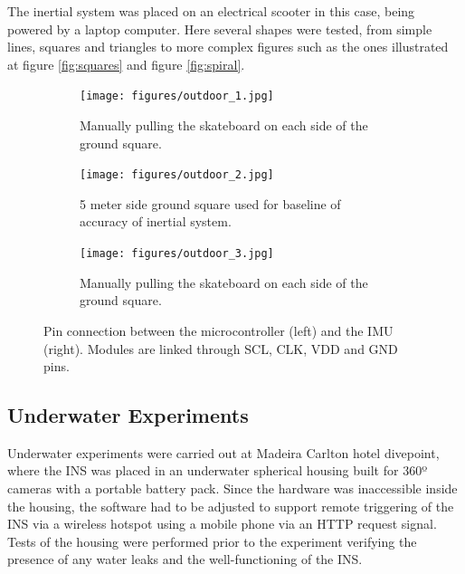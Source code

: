 

The inertial system was placed on an electrical scooter in this case, being powered by a laptop computer. Here several shapes were tested, from simple lines, squares and triangles to more complex figures such as the ones illustrated at figure \ref{fig:squares} and figure \ref{fig:spiral}.

\begin{figure}[!h]
    \centering
    \begin{subfigure}{0.7\textwidth}
        \centering
        \texttt{[image: figures/outdoor\_1.jpg]}
        \caption{ Manually pulling the skateboard on each side of the ground square. }
        \label{fig:outdoor_1}
    \end{subfigure}

    \begin{subfigure}{0.40\textwidth}
        \centering
        \texttt{[image: figures/outdoor\_2.jpg]}
        \caption{5 meter side ground square used for baseline of accuracy of inertial system.}
        \label{fig:outdoor_2}
    \end{subfigure}
    \begin{subfigure}{0.40\textwidth}
        \centering
        \texttt{[image: figures/outdoor\_3.jpg]}
        \caption{ Manually pulling the skateboard on each side of the ground square. }
        \label{fig:outdoor_3}
    \end{subfigure}
    \caption{Pin connection between the microcontroller (left) and the IMU (right). Modules are linked through SCL, CLK, VDD and GND pins.}
    \label{fig:hardware}
\end{figure}

\subsection{Underwater Experiments}

Underwater experiments were carried out at Madeira Carlton hotel divepoint, where the INS was placed in an underwater spherical housing built for 360º cameras with a portable battery pack. Since the hardware was inaccessible inside the housing, the software had to be adjusted to support remote triggering of the INS via a wireless hotspot using a mobile phone via an HTTP request signal. Tests of the housing were performed prior to the experiment verifying the presence of any water leaks and the well-functioning of the INS.

